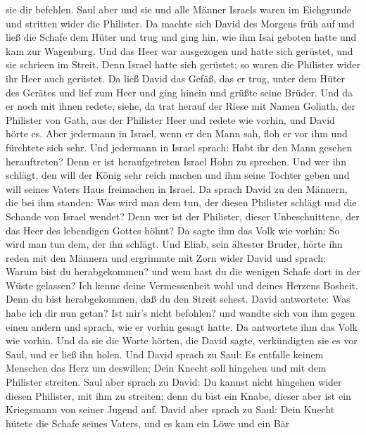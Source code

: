 sie dir befehlen.  Saul aber und sie und alle Männer
Israels waren im Eichgrunde und stritten wider die Philister.
 Da machte sich David des Morgens früh auf und ließ die
Schafe dem Hüter und trug und ging hin, wie ihm Isai geboten hatte und
kam zur Wagenburg. Und das Heer war ausgezogen und hatte sich gerüstet,
und sie schrieen im Streit.  Denn Israel hatte sich
gerüstet; so waren die Philister wider ihr Heer auch gerüstet.
 Da ließ David das Gefäß, das er trug, unter dem Hüter des
Gerätes und lief zum Heer und ging hinein und grüßte seine Brüder.
 Und da er noch mit ihnen redete, siehe, da trat herauf der
Riese mit Namen Goliath, der Philister von Gath, aus der Philister Heer
und redete wie vorhin, und David hörte es.  Aber jedermann
in Israel, wenn er den Mann sah, floh er vor ihm und fürchtete sich
sehr.  Und jedermann in Israel sprach: Habt ihr den Mann
gesehen herauftreten? Denn er ist heraufgetreten Israel Hohn zu
sprechen. Und wer ihn schlägt, den will der König sehr reich machen und
ihm seine Tochter geben und will seines Vaters Haus freimachen in
Israel.  Da sprach David zu den Männern, die bei ihm
standen: Was wird man dem tun, der diesen Philister schlägt und die
Schande von Israel wendet? Denn wer ist der Philister, dieser
Unbeschnittene, der das Heer des lebendigen Gottes höhnt? 
Da sagte ihm das Volk wie vorhin: So wird man tun dem, der ihn schlägt.
 Und Eliab, sein ältester Bruder, hörte ihn reden mit den
Männern und ergrimmte mit Zorn wider David und sprach: Warum bist du
herabgekommen? und wem hast du die wenigen Schafe dort in der Wüste
gelassen? Ich kenne deine Vermessenheit wohl und deines Herzens Bosheit.
Denn du bist herabgekommen, daß du den Streit sehest. 
David antwortete: Was habe ich dir nun getan? Ist mir's nicht befohlen?
 und wandte sich von ihm gegen einen andern und sprach, wie
er vorhin gesagt hatte. Da antwortete ihm das Volk wie vorhin.
 Und da sie die Worte hörten, die David sagte, verkündigten
sie es vor Saul, und er ließ ihn holen.  Und David sprach
zu Saul: Es entfalle keinem Menschen das Herz um deswillen; Dein Knecht
soll hingehen und mit dem Philister streiten.  Saul aber
sprach zu David: Du kannst nicht hingehen wider diesen Philister, mit
ihm zu streiten; denn du bist ein Knabe, dieser aber ist ein Kriegsmann
von seiner Jugend auf.  David aber sprach zu Saul: Dein
Knecht hütete die Schafe seines Vaters, und es kam ein Löwe und ein Bär
